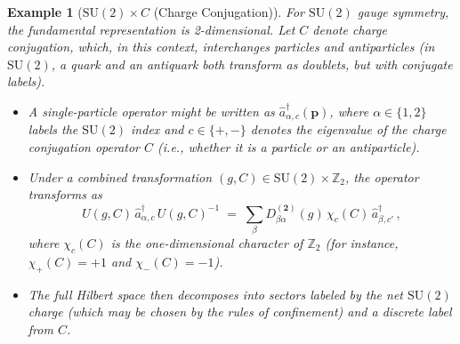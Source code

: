 \documentclass[12pt,a4paper]{article}
\newtheorem{example}{Example}
\begin{document}
\begin{example}[$\mathrm{SU}(2) \times C$ (Charge Conjugation)]
	For $\mathrm{SU}(2)$ gauge symmetry, the fundamental representation is 2-dimensional.
	Let $C$ denote charge conjugation, which, in this context, interchanges particles and antiparticles (in $\mathrm{SU}(2)$, a quark and an antiquark both transform as doublets, but with conjugate labels).
	\begin{itemize}
		\item A single-particle operator might be written as $\hat{a}^\dagger_{\alpha,c}(\mathbf{p})$, where $\alpha\in\{1,2\}$ labels the $\mathrm{SU}(2)$ index and $c\in\{+,-\}$ denotes the eigenvalue of the charge conjugation operator $C$ (i.e., whether it is a particle or an antiparticle).  
		
		\item Under a combined transformation $(g,C)\in \mathrm{SU}(2)\times \mathbb{Z}_2$, the operator transforms as 
		\[
		U(g,C)\,\hat{a}^\dagger_{\alpha,c}\,U(g,C)^{-1} \;=\; \sum_{\beta} D^{(\mathbf{2})}_{\beta\alpha}(g)\, \chi_c(C)\,\hat{a}^\dagger_{\beta,c'}\,,
		\]
		where $\chi_c(C)$ is the one-dimensional character of $\mathbb{Z}_2$ (for instance, $\chi_+(C)=+1$ and $\chi_-(C)=-1$).  
		
		\item The full Hilbert space then decomposes into sectors labeled by the net $\mathrm{SU}(2)$ charge (which may be chosen by the rules of confinement) and a discrete label from $C$.
	\end{itemize}
\end{example}
\end{document}
